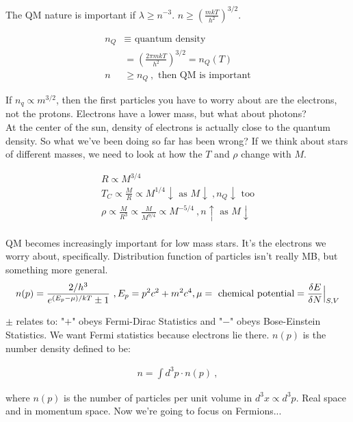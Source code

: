 \documentclass[10pt,letterpaper,final]{book}
\newcommand{\pt}{\propto}
\newcommand{\rp}{\right)}
\newcommand{\lp}{\left(}
\begin{document}
The QM nature is important if $\lambda \geq n^{-3} $. $n \geq \lp \frac{mkT}{h^2} \rp^{3/2}$. 

\begin{align}
n_Q &\equiv \text{ quantum density}\\
&= \lp \frac{2 \pi m k T}{h^2} \rp ^{3/2} = n_Q(T)\\
n &\geq n_Q~,\text{ then QM is important}
\end{align}

If $n_q \pt m^{3/2}$, then the first particles you have to worry about are the electrons, not the protons. Electrons have a lower mass, but what about photons? \\

At the center of the sun, density of electrons is actually close to the quantum density. So what we've been doing so far has been wrong? If we think about stars of different masses, we need to look at how the $T$ and $\rho$ change with $M$. 

\begin{align}
R \pt M^{3/4}\\
T_C \pt \frac{M}{R} \pt M^{1/4} \downarrow \text{ as } M \downarrow~, n_Q \downarrow \text{ too}\\
\rho \pt \frac{M}{R^3} \pt \frac{M}{M^{9/4}} \pt M^{-5/4}~, n \uparrow \text{ as } M \downarrow\\
\end{align}

QM becomes increasingly important for low mass stars. It's the electrons we worry about, specifically. Distribution function of particles isn't really MB, but something more general.\\

\begin{align}
n(p)= \frac{2/h^3}{e^{(E_p - \mu)/kT} \pm 1}~, E_p = p^2 c^2 + m^2 c^4,\mu = \text{ chemical potential} = \frac{\delta E}{ \delta N} \Bigl\lvert_{S,V}
\end{align}

$\pm$ relates to: "$+$" obeys Fermi-Dirac Statistics and "$-$" obeys Bose-Einstein Statistics. We want Fermi statistics because electrons lie there. $n(p)$ is the number density defined to be: 

\begin{align}
n= \int d^3 p \cdot n(p)~,
\end{align}

where $n(p)$ is the number of particles per unit volume in $d^3x \pt d^3p$. Real space and in momentum space. Now we're going to focus on Fermions...
\end{document}
